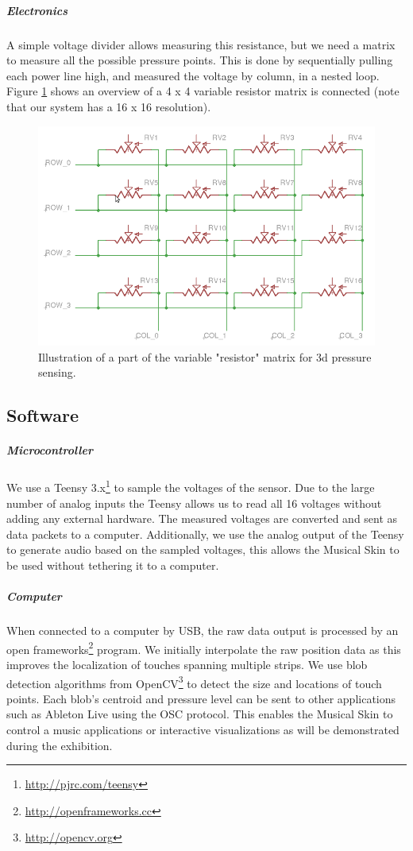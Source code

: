 \documentclass{sigchi-ext}
\begin{document}
\subparagraph{Electronics}
A simple voltage divider allows measuring this resistance, but we need a matrix to measure all the possible pressure points.
This is done by sequentially pulling each power line high, and measured the voltage by column, in a nested loop.
Figure \ref{fig:matrix} shows an overview of a 4 x 4 variable resistor matrix is connected (note that our system has a 16 x 16 resolution).

\begin{figure}
    \centering
    \includegraphics[width=\columnwidth]{figures/matrix}
    \caption{Illustration of a part of the variable "resistor" matrix for 3d pressure sensing.}\label{fig:matrix}
\end{figure}


\subsection{Software}
\subparagraph{Microcontroller}

We use a Teensy 3.x\footnote{\url{http://pjrc.com/teensy}} to sample the voltages of the sensor. Due to the large number of analog inputs the Teensy allows us to read all 16 voltages without adding any external hardware.
The measured voltages are converted and sent as data packets to a computer. Additionally, we use the analog output of the Teensy to generate audio based on the sampled voltages, this allows the Musical Skin to be used without tethering it to a computer.

\subparagraph{Computer}
When connected to a computer by USB, the raw data output is processed by an open frameworks\footnote{\url{http://openframeworks.cc}} program. We initially interpolate the raw position data as this improves the localization of touches spanning multiple strips. We use blob detection algorithms from OpenCV\footnote{\url{http://opencv.org}} to detect the size and locations of touch points. Each blob's centroid and pressure level can be sent to other applications such as Ableton Live using the OSC protocol. This enables the Musical Skin to control a music applications or interactive visualizations as will be demonstrated during the exhibition.
\end{document}
